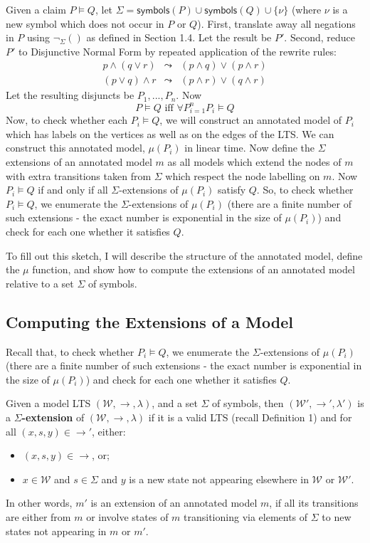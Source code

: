 Given a claim $P \models Q$, let $\Sigma = \mathsf{symbols}(P) \cup \mathsf{symbols}(Q) \cup \{\nu\}$ (where $\nu$ is a new symbol which does not occur in $P$ or $Q$).
First, translate away all negations in $P$ using $\neg_\Sigma()$ as defined in Section 1.4.
Let the result be $P'$.
Second, reduce $P'$ to Disjunctive Normal Form by repeated application of the rewrite rules:
\begin{eqnarray*}
p \land (q \lor r) & \leadsto & (p \land q) \lor (p \land r)  \\
(p \lor q) \land r & \leadsto & (p \land r) \lor (q \land r) 
\end{eqnarray*}
Let the resulting disjuncts be $P_1, ..., P_n$. 
Now 
\[
P \models Q \mbox{ iff } \forall P_{i=1}^n P_i \models Q
\]
Now, to check whether each $P_i \models Q$, we will construct an annotated model of $P_i$ which has labels on the vertices as well as on the edges of the LTS. We can construct this annotated model, $\mu(P_i)$ in linear time. 
Now define the $\Sigma$ extensions of an annotated model $m$ as all models which extend the nodes of $m$ with extra transitions taken from $\Sigma$ which respect the node labelling on $m$.
Now $P_i \models Q$ if and only if all $\Sigma$-extensions of $\mu(P_i)$ satisfy $Q$.
So, to check whether $P_i \models Q$, we enumerate the $\Sigma$-extensions of $\mu(P_i)$ (there are a finite number of such extensions - the exact number is exponential in the size of $\mu(P_i)$) and check for each one whether it satisfies $Q$.

To fill out this sketch, I will describe the structure of the annotated model, define the $\mu$ function, and show how to compute the extensions of an annotated model relative to a set $\Sigma$ of symbols.


\subsection{Computing the Extensions of a Model}

Recall that, to check whether $P_i \models Q$, we enumerate the $\Sigma$-extensions of $\mu(P_i)$ (there are a finite number of such extensions - the exact number is exponential in the size of $\mu(P_i)$) and check for each one whether it satisfies $Q$.

\begin{definition}
Given a model LTS $(\mathcal{W},\rightarrow,\lambda)$,  and a set $\Sigma$ of symbols, then $(\mathcal{W'},\rightarrow',\lambda')$ is a {\bf $\Sigma$-extension} of $(\mathcal{W},\rightarrow,\lambda)$ if it is a valid LTS (recall Definition 1) and for all $(x,s,y) \in \rightarrow'$, either:
\begin{itemize} 
\item
$(x, s, y) \in \rightarrow$,  or;
\item
 $x \in \mathcal{W}$ and $s \in \Sigma$ and $y$ is a new state not appearing elsewhere in $\mathcal{W}$ or $\mathcal{W'}$.
\end{itemize}
\end{definition}
In other words, $m'$ is an extension of an annotated model $m$, if all its transitions are either from $m$ or involve states of $m$ transitioning via elements of $\Sigma$ to new states not appearing in $m$ or $m'$.


